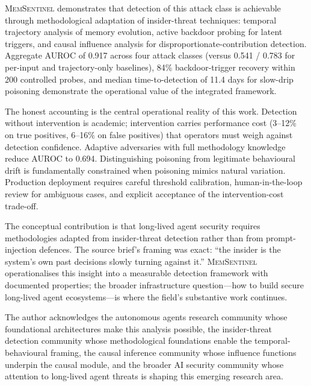 \documentclass[sigconf,nonacm]{acmart}
\begin{document}
\textsc{MemSentinel} demonstrates that detection of this attack
class is achievable through methodological adaptation of
insider-threat techniques: temporal trajectory analysis of memory
evolution, active backdoor probing for latent triggers, and
causal influence analysis for disproportionate-contribution
detection. Aggregate AUROC of 0.917 across four attack classes
(versus 0.541 / 0.783 for per-input and trajectory-only baselines),
84\% backdoor-trigger recovery within 200 controlled probes, and
median time-to-detection of 11.4 days for slow-drip poisoning
demonstrate the operational value of the integrated framework.

The honest accounting is the central operational reality of this
work. Detection without intervention is academic; intervention
carries performance cost (3--12\% on true positives, 6--16\% on
false positives) that operators must weigh against detection
confidence. Adaptive adversaries with full methodology knowledge
reduce AUROC to 0.694. Distinguishing poisoning from legitimate
behavioural drift is fundamentally constrained when poisoning
mimics natural variation. Production deployment requires
careful threshold calibration, human-in-the-loop review for
ambiguous cases, and explicit acceptance of the intervention-cost
trade-off.

The conceptual contribution is that long-lived agent security
requires methodologies adapted from insider-threat detection
rather than from prompt-injection defences. The source brief's
framing was exact: ``the insider is the system's own past
decisions slowly turning against it.'' \textsc{MemSentinel}
operationalises this insight into a measurable detection
framework with documented properties; the broader infrastructure
question---how to build secure long-lived agent ecosystems---is
where the field's substantive work continues.

\begin{acks}
The author acknowledges the autonomous agents research community
whose foundational architectures make this analysis possible, the
insider-threat detection community whose methodological
foundations enable the temporal-behavioural framing, the causal
inference community whose influence functions underpin the
causal module, and the broader AI security community whose
attention to long-lived agent threats is shaping this emerging
research area.
\end{acks}
\end{document}
